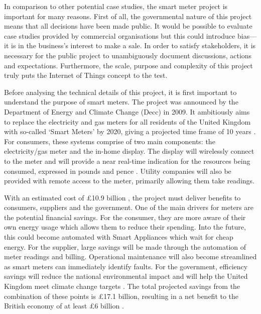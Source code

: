       In comparison to other potential case studies, the smart meter project is important for many reasons. First of all, the governmental nature of this project means that all decisions have been made public. It would be possible to evaluate case studies provided by commercial organisations but this could introduce bias---it is in the business's interest to make a sale. In order to satisfy stakeholders, it is necessary for the public project to unambiguously document discussions, actions and expectations. Furthermore, the scale, purpose and complexity of this project truly puts the Internet of Things concept to the test.

      Before analysing the technical details of this project, it is first important to understand the purpose of smart meters. The project was announced by the Department of Energy and Climate Change (Decc) in 2009. It ambitiously aims to replace the electricity and gas meters for all residents of the United Kingdom with so-called `Smart Meters' by 2020, giving a projected time frame of 10 years \citep{SMannouncement:2009}. For consumers, these systems comprise of two main components: the electricity/gas meter and the in-home display. The display will wirelessly connect to the meter and will provide a near real-time indication for the resources being consumed, expressed in pounds and pence \citep{SMguide:2013}. Utility companies will also be provided with remote access to the meter, primarily allowing them take readings.

      With an estimated cost of £10.9 billion \citep{SMthirdreport:2014}, the project must deliver benefits to consumers, suppliers and the government. One of the main drivers for meters are the potential financial savings. For the consumer, they are more aware of their own energy usage which allows them to reduce their spending. Into the future, this could become automated with Smart Appliances which wait for cheap energy. For the supplier, large savings will be made through the automation of meter readings and billing. Operational maintenance will also become streamlined as smart meters can immediately identify faults. For the government, efficiency savings will reduce the national environmental impact and will help the United Kingdom meet climate change targets \citep{SMUK:2012}. The total projected savings from the combination of these points is £17.1 billion, resulting in a net benefit to the British economy of at least £6 billion \citep{SMthirdreport:2014}.

